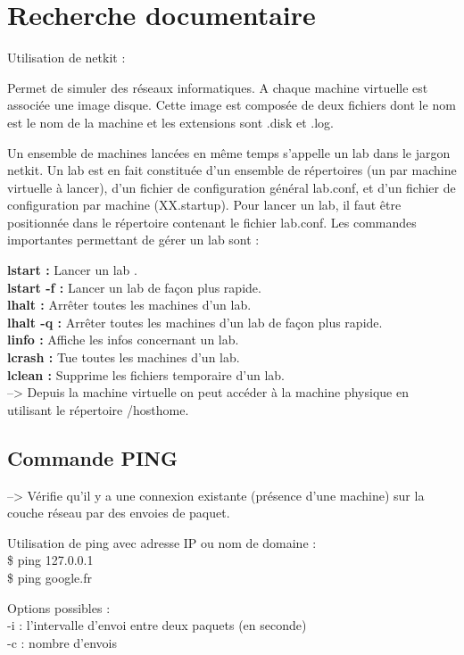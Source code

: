\documentclass[a4paper]{article}
\begin{document}
	\section{Recherche documentaire}
	
{\Large Utilisation de netkit :} 

Permet de simuler des réseaux informatiques. A chaque machine virtuelle est associée une image disque. Cette image est composée de deux fichiers dont le nom est le nom de la machine et les extensions sont .disk et .log.

Un ensemble de machines lancées en même temps s’appelle un lab dans le jargon netkit. Un lab est en fait constituée d’un ensemble de répertoires (un par machine virtuelle à lancer), d’un fichier de configuration général lab.conf, et d’un fichier de configuration par machine (XX.startup). Pour lancer un lab, il faut être positionnée dans le répertoire contenant le fichier lab.conf. Les commandes importantes permettant de gérer un lab sont :

\noindent
\textbf{lstart :} Lancer un lab . \\
\textbf{lstart -f :} Lancer un lab de façon plus rapide.\\
\textbf{lhalt :} Arrêter toutes les machines d'un lab.\\
\textbf{lhalt -q :} Arrêter toutes les machines d'un lab de façon plus rapide.\\
\textbf{linfo :} Affiche les infos concernant un lab.\\
\textbf{lcrash :} Tue toutes les machines d'un lab.\\
\textbf{lclean :} Supprime les fichiers temporaire d'un lab.\\

--> Depuis la machine virtuelle on peut accéder à la machine physique en utilisant le répertoire /hosthome.

		\subsection{Commande PING}
--> Vérifie qu'il y a une connexion existante (présence d'une machine) sur la couche réseau par des envoies de paquet. 	

Utilisation de ping avec adresse IP ou nom de domaine :\\
\noindent
\$ ping 127.0.0.1\\
\$ ping google.fr


Options possibles : \\
-i : l'intervalle d'envoi entre deux paquets (en seconde)\\
-c : nombre d'envois
\end{document}
